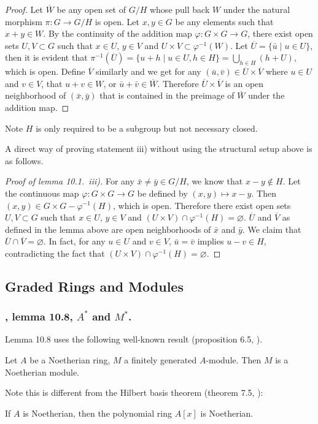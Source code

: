 \documentclass{note}
\begin{document}
\begin{proof}
  Let $\overline{W}$ be any open set of $G/H$ whose pull back $W$
  under the natural morphism $\pi\colon G \to G/H$ is open. Let
  $x,y \in G$ be any elements such that $x + y \in W$. By the
  continuity of the addition map $\varphi\colon G \times G \to G$,
  there exist open sets $U,V \subset G$ such that $x\in U$, $y\in V$
  and $U\times V \subset \varphi^{-1}(W)$. Let
  $\overline{U} = \{\bar{u} \mid u \in U\}$, then it is evident that
  $\pi^{-1}\left(\overline{U}\right) = \{u+h \mid u \in U, h \in H\} =
  \bigcup_{h\in H}(h+U)$, which is open. Define $\overline{V}$
  similarly and we get for any
  $(\bar{u},\bar{v}) \in \overline{U}\times\overline{V}$ where
  $u \in U$ and $v \in V$, that $u + v \in W$, or
  $\bar{u} + \bar{v} \in \overline{W}$. Therefore
  $\overline{U} \times \overline{V}$ is an open neighborhood of
  $(\bar{x},\bar{y})$ that is contained in the preimage of
  $\overline{W}$ under the addition map.
\end{proof}

\begin{remark*}
  Note $H$ is only required to be a subgroup but not necessary closed.
\end{remark*}

A direct way of proving statement iii) without using the structural
setup above is as follows.

\begin{proof}[Proof of lemma 10.1.~iii)] For any
  $\bar{x} \neq \bar{y} \in G/H$, we know that $x - y \notin H$. Let
  the continuous map $\varphi\colon G\times G \to G$ be defined by
  $(x,y) \mapsto x - y$. Then $(x,y) \in G\times G - \varphi^{-1}(H)$,
  which is open. Therefore there exist open sets $U,V \subset G$ such
  that $x\in U$, $y\in V$ and
  $(U\times V) \cap \varphi^{-1}(H) = \varnothing$. $\overline{U}$ and
  $\overline{V}$ as defined in the lemma above are open neighborhoods
  of $\bar{x}$ and $\bar{y}$. We claim that
  $\overline{U} \cap \overline{V} = \varnothing$. In fact, for any
  $u\in U$ and $v\in V$, $\bar{u} = \bar{v}$ implies
  $u - v \in H$, contradicting the fact that
  $(U\times V) \cap \varphi^{-1}(H) = \varnothing$.  
\end{proof}

\subsection*{Graded Rings and Modules}
\subsubsection*{, lemma 10.8, $A^*$ and $M^*$.}
Lemma 10.8 uses the following well-known result (proposition 6.5,
).
\begin{proposition*}
  Let $A$ be a Noetherian ring, $M$ a finitely generated
  $A$-module. Then $M$ is a Noetherian module.
\end{proposition*}
Note this is different from the Hilbert basis theorem (theorem 7.5,
):
\begin{theorem*}
  If $A$ is Noetherian, then the polynomial ring $A[x]$ is Noetherian.
\end{theorem*}
\end{document}
